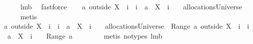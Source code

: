 \begin{isabellebody}
\ \ \ \ \isamarkupfalse%
\ lm{}{}b\ \isamarkupfalse%
\ fastforce\isanewline
\ \ \isamarkupfalse%
\ {\isachardoublequoteopen}a\ outside\ {\isacharparenleft}X\ {\isasymunion}\ {\isacharbraceleft}i{\isacharbraceright}{\isacharparenright}\ {\isasymunion}\ {\isacharbraceleft}i{\isacharbraceright}\ {\isasymtimes}\ {\isacharparenleft}{\isacharbraceleft}{\isasymUnion}{\isacharparenleft}a\ {\isacharbackquote}{\isacharbackquote}\ {\isacharparenleft}X\ {\isasymunion}\ {\isacharbraceleft}i{\isacharbraceright}{\isacharparenright}{\isacharparenright}{\isacharbraceright}\ {\isacharminus}\ {\isacharbraceleft}{\isacharbraceleft}{\isacharbraceright}{\isacharbraceright}{\isacharparenright}\ {\isasymin}\ allocationsUniverse{\isachardoublequoteclose}\isanewline
\ \ \ \ \isamarkupfalse%
\ {\isacharparenleft}metis\ {\isachardoublequoteopen}{}{\isachardoublequoteclose}{\isacharparenright}\isanewline
\ \ \isamarkupfalse%
\ {\isachardoublequoteopen}a\ outside\ {\isacharparenleft}X\ {\isasymunion}\ {\isacharbraceleft}i{\isacharbraceright}{\isacharparenright}\ {\isasymunion}\ {\isacharbraceleft}i{\isacharbraceright}\ {\isasymtimes}\ {\isacharparenleft}{\isacharbraceleft}{\isasymUnion}{\isacharparenleft}a\ {\isacharbackquote}{\isacharbackquote}\ {\isacharparenleft}X\ {\isasymunion}\ {\isacharbraceleft}i{\isacharbraceright}{\isacharparenright}{\isacharparenright}{\isacharbraceright}\ {\isacharminus}\ {\isacharbraceleft}{\isacharbraceleft}{\isacharbraceright}{\isacharbraceright}{\isacharparenright}\ {\isasymin}\ allocationsUniverse\ {\isasymand}\ {\isasymUnion}Range\ {\isacharparenleft}a\ outside\ {\isacharparenleft}X\ {\isasymunion}\ {\isacharbraceleft}i{\isacharbraceright}{\isacharparenright}\ {\isasymunion}\ {\isacharbraceleft}i{\isacharbraceright}\ {\isasymtimes}\ {\isacharparenleft}{\isacharbraceleft}{\isasymUnion}{\isacharparenleft}a\ {\isacharbackquote}{\isacharbackquote}\ {\isacharparenleft}X\ {\isasymunion}\ {\isacharbraceleft}i{\isacharbraceright}{\isacharparenright}{\isacharparenright}{\isacharbraceright}\ {\isacharminus}\ {\isacharbraceleft}{\isacharbraceleft}{\isacharbraceright}{\isacharbraceright}{\isacharparenright}{\isacharparenright}\ {\isacharequal}\ {\isasymUnion}Range\ a{\isachardoublequoteclose}\isanewline
\ \ \ \ \isamarkupfalse%
\ {\isachardoublequoteopen}{}{\isachardoublequoteclose}\ \isamarkupfalse%
\ {\isacharparenleft}metis\ {\isacharparenleft}no{\isacharunderscore}types{\isacharparenright}\ lm{}{}b{\isacharparenright}\isanewline

\end{isabellebody}
